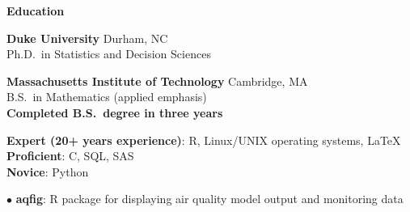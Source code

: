 \documentclass[11pt]{article}
\def\newsectn{\vspace*{0.6cm}}
\def\newitem{\vspace*{0.2cm}}
\begin{document}
\newsectn
{\Large \textbf{Education}}

\textbf{Duke University} \hfill Durham, NC\\
Ph.D.~in Statistics and Decision Sciences %

\newpage
{}



\newitem
\textbf{Massachusetts Institute of Technology} \hfill Cambridge, MA\\
B.S.~in Mathematics (applied emphasis)\\ %
\textbf{Completed B.S.~degree in three years}



\newsectn
{}

\textbf{Expert (20+ years experience)}: R, Linux/UNIX operating systems, LaTeX\\
\textbf{Proficient}: C, SQL, SAS\\
\textbf{Novice}: Python



\newsectn
{}

$\bullet$ \textbf{aqfig}: R package for displaying air quality model output and monitoring data
\end{document}
